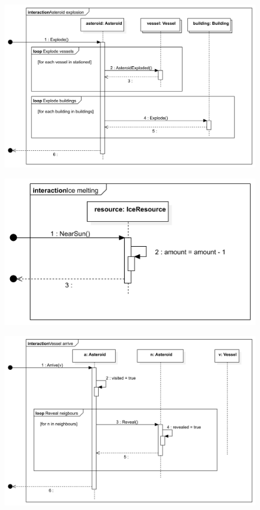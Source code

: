 \begin{figure}[H] 
\centering 
\includegraphics[width=1\textwidth]{docs/3_Project/svg/Design Model!Sun Distance!Asteroid explosion!Asteroid explosion_9.png} 
\end{figure} 

\begin{figure}[H] 
\centering 
\includegraphics[width=1\textwidth]{docs/3_Project/svg/Design Model!Sun Distance!Ice melting!Ice melting_10.png} 
\end{figure} 

\begin{figure}[H] 
\centering 
\includegraphics[width=1\textwidth]{docs/3_Project/svg/Design Model!Vessel Actions!Vessel arrive!Vessel arrive_11.png} 
\end{figure} 

